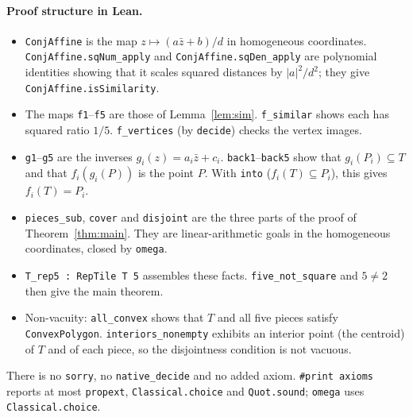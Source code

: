 \documentclass[11pt]{article}
\theoremstyle{definition}
\theoremstyle{remark}
\begin{document}
\paragraph{Proof structure in Lean.}
\begin{itemize}\raggedright
\item \texttt{ConjAffine} is the map $z\mapsto(a\bar z+b)/d$ in homogeneous coordinates.
\texttt{ConjAffine.sqNum\_apply} and \texttt{ConjAffine.sqDen\_apply} are polynomial
identities showing that it scales squared distances by $|a|^2/d^2$; they give
\texttt{ConjAffine.isSimilarity}.
\item The maps \texttt{f1}--\texttt{f5} are those of Lemma~\ref{lem:sim}. \texttt{f\_similar}
shows each has squared ratio $1/5$. \texttt{f\_vertices} (by \texttt{decide}) checks the
vertex images.
\item \texttt{g1}--\texttt{g5} are the inverses $g_i(z)=a_i\bar z+c_i$. \texttt{back1}--\texttt{back5}
show that $g_i(P_i)\subseteq T$ and that $f_i(g_i(P))$ is the point $P$. With \texttt{into}
($f_i(T)\subseteq P_i$), this gives $f_i(T)=P_i$.
\item \texttt{pieces\_sub}, \texttt{cover} and \texttt{disjoint} are the three parts of the
proof of Theorem~\ref{thm:main}. They are linear-arithmetic goals in the homogeneous
coordinates, closed by \texttt{omega}.
\item \texttt{T\_rep5 : RepTile T 5} assembles these facts. \texttt{five\_not\_square} and
$5\ne2$ then give the main theorem.
\item Non-vacuity: \texttt{all\_convex} shows that $T$ and all five pieces satisfy
\texttt{ConvexPolygon}. \texttt{interiors\_nonempty} exhibits an interior point (the
centroid) of $T$ and of each piece, so the disjointness condition is not vacuous.
\end{itemize}
There is no \texttt{sorry}, no \texttt{native\_decide} and no added axiom.
\texttt{\#print axioms} reports at most \texttt{propext}, \texttt{Classical.choice} and
\texttt{Quot.sound}; \texttt{omega} uses \texttt{Classical.choice}.
\end{document}
